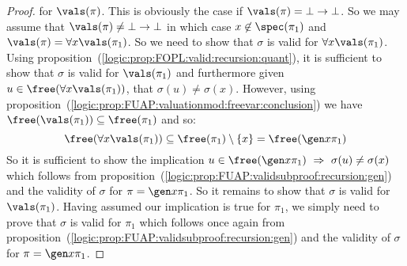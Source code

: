 \begin{proof}
for $\vals(\pi)$. This is obviously the case if
$\vals(\pi)=\bot\to\bot$. So we may assume that
$\vals(\pi)\neq\bot\to\bot$ in which case $x\not\in\spec(\pi_{1})$
and $\vals(\pi)=\forall x\vals(\pi_{1})$. So we need to show that
$\sigma$ is valid for $\forall x\vals(\pi_{1})$. Using
proposition~(\ref{logic:prop:FOPL:valid:recursion:quant}), it is
sufficient to show that $\sigma$ is valid for $\vals(\pi_{1})$ and
furthermore given $u\in\free(\forall x\vals(\pi_{1}))$, that
$\sigma(u)\neq\sigma(x)$. However, using
proposition~(\ref{logic:prop:FUAP:valuationmod:freevar:conclusion})
we have $\free(\vals(\pi_{1}))\subseteq\free(\pi_{1})$ and so:
    \[
    \free(\forall
    x\vals(\pi_{1}))\subseteq\free(\pi_{1})\setminus\{x\}=\free(\gen
    x\pi_{1})
    \]
So it is sufficient to show the implication $u\in\free(\gen
x\pi_{1})\ \Rightarrow\ \sigma(u)\neq\sigma(x)$ which follows from
proposition~(\ref{logic:prop:FUAP:validsubproof:recursion:gen}) and
the validity of $\sigma$ for $\pi=\gen x\pi_{1}$. So it remains to
show that $\sigma$ is valid for $\vals(\pi_{1})$. Having assumed our
implication is true for $\pi_{1}$, we simply need to prove that
$\sigma$ is valid for $\pi_{1}$ which follows once again from
proposition~(\ref{logic:prop:FUAP:validsubproof:recursion:gen}) and
the validity of $\sigma$ for $\pi=\gen x\pi_{1}$.
\end{proof}
